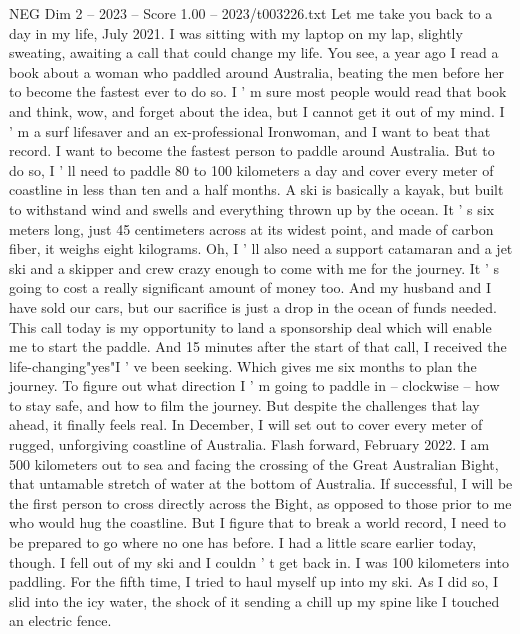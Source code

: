\begin{textsample}{NEG Dim 2 – 2023 – Score 1.00 – 2023/t003226.txt}  \label{ex:f2_neg_048}
Let me take you back to a day in my life, July 2021.
I was sitting with my laptop on my lap, slightly sweating, awaiting a call that could change my life.
You see, a year ago I read a book about a woman who paddled around Australia, beating the men before her to become the fastest ever to do so.
I ' m sure most people would read that book and think, wow, and forget about the idea, but I cannot get it out of my mind.
I ' m a surf lifesaver and an ex-professional Ironwoman, and I want to beat that record.
I want to become the fastest person to paddle around Australia.
But to do so, I ' ll need to paddle 80 to 100 kilometers a day and cover every meter of coastline in less than ten and a half months.
A ski is basically a kayak, but built to withstand wind and swells and everything thrown up by the ocean.
It ' s six meters long, just 45 centimeters across at its widest point, and made of carbon fiber, it weighs eight kilograms.
Oh, I ' ll also need a support catamaran and a jet ski and a skipper and crew crazy enough to come with me for the journey.
It ' s going to cost a really significant amount of money too.
And my husband and I have sold our cars, but our sacrifice is just a drop in the ocean of funds needed.
This call today is my opportunity to land a sponsorship deal which will enable me to start the paddle.
And 15 minutes after the start of that call, I received the life-changing"yes"I ' ve been seeking.
Which gives me six months to plan the journey.
To figure out what direction I ' m going to paddle in -- clockwise -- how to stay safe, and how to film the journey.
But despite the challenges that lay ahead, it finally feels real.
In December, I will set out to cover every meter of rugged, unforgiving coastline of Australia.
Flash forward, February 2022.
I am 500 kilometers out to sea and facing the crossing of the Great Australian Bight, that untamable stretch of water at the bottom of Australia.
If successful, I will be the first person to cross directly across the Bight, as opposed to those prior to me who would hug the coastline.
But I figure that to break a world record, I need to be prepared to go where no one has before.
I had a little scare earlier today, though.
I fell out of my ski and I couldn ' t get back in.
I was 100 kilometers into paddling.
For the fifth time, I tried to haul myself up into my ski.
As I did so, I slid into the icy water, the shock of it sending a chill up my spine like I touched an electric fence.

\end{textsample}
